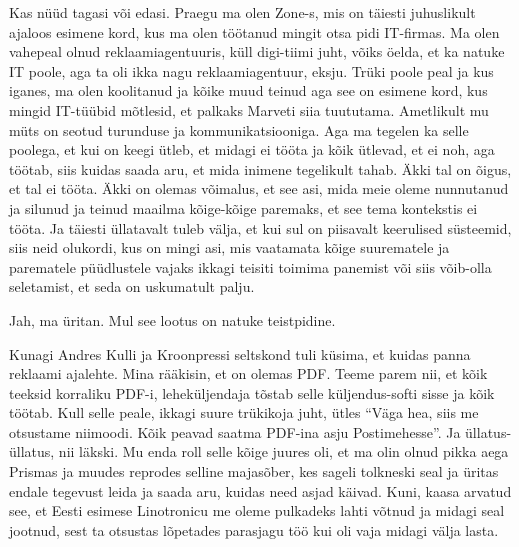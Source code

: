 
Kas nüüd tagasi või edasi. Praegu ma olen Zone-s, mis on täiesti 
juhuslikult ajaloos esimene kord, kus ma olen töötanud mingit otsa pidi 
IT-firmas. Ma olen vahepeal olnud reklaamiagentuuris, küll digi-tiimi juht, 
võiks öelda, et ka natuke IT poole, aga ta oli ikka nagu reklaamiagentuur, 
eksju. Trüki poole peal ja kus iganes, ma olen koolitanud ja kõike muud teinud 
aga see on esimene kord, kus mingid IT-tüübid mõtlesid, et palkaks Marveti siia 
tuututama. Ametlikult mu  müts on seotud turunduse ja kommunikatsiooniga. Aga 
ma tegelen ka selle poolega, et kui on  keegi ütleb, et midagi ei tööta ja kõik 
ütlevad, et ei noh, aga töötab, siis kuidas saada aru, et mida inimene 
tegelikult tahab. Äkki tal on õigus, et tal ei tööta. Äkki on olemas võimalus, 
et see asi, mida meie oleme nunnutanud ja silunud ja teinud maailma kõige-kõige 
paremaks, et see tema kontekstis ei tööta. Ja täiesti üllatavalt tuleb välja, 
et kui sul on piisavalt keerulised süsteemid, siis  neid olukordi, kus on mingi 
asi, mis vaatamata kõige suurematele ja parematele püüdlustele vajaks ikkagi 
teisiti toimima panemist või siis võib-olla seletamist,  et seda on uskumatult 
palju. 


Jah, ma üritan. Mul see lootus on natuke teistpidine. 

Kunagi Andres Kulli ja Kroonpressi 
seltskond tuli küsima, et kuidas panna reklaami ajalehte. Mina rääkisin, et on 
olemas PDF. Teeme parem nii, et kõik  teeksid korraliku PDF-i, leheküljendaja 
tõstab selle küljendus-softi sisse ja kõik töötab. Kull selle peale, ikkagi 
suure trükikoja juht, ütles \enquote{Väga hea, siis  me otsustame niimoodi. 
Kõik peavad saatma PDF-ina asju Postimehesse}. Ja üllatus-üllatus, nii läkski. 
Mu enda roll selle kõige juures oli, et ma olin olnud pikka aega Prismas ja 
muudes reprodes selline majasõber, kes sageli tolkneski seal ja üritas endale 
tegevust leida ja saada aru, kuidas need asjad käivad. Kuni, kaasa arvatud see, 
et Eesti esimese Linotronicu me oleme pulkadeks lahti võtnud ja midagi seal 
jootnud, sest ta  otsustas lõpetades parasjagu töö kui oli vaja midagi välja 
lasta. 

